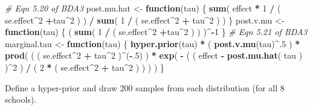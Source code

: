 \documentclass[]{article}
\newenvironment{Shaded}{\begin{snugshade}}{\end{snugshade}}
\newcommand{\KeywordTok}[1]{\textcolor[rgb]{0.13,0.29,0.53}{\textbf{#1}}}
\newcommand{\DecValTok}[1]{\textcolor[rgb]{0.00,0.00,0.81}{#1}}
\newcommand{\StringTok}[1]{\textcolor[rgb]{0.31,0.60,0.02}{#1}}
\newcommand{\CommentTok}[1]{\textcolor[rgb]{0.56,0.35,0.01}{\textit{#1}}}
\newcommand{\ControlFlowTok}[1]{\textcolor[rgb]{0.13,0.29,0.53}{\textbf{#1}}}
\newcommand{\OperatorTok}[1]{\textcolor[rgb]{0.81,0.36,0.00}{\textbf{#1}}}
\newcommand{\NormalTok}[1]{#1}
\begin{document}
\begin{Shaded}
\begin{Highlighting}[]
\CommentTok{# Eqn 5.20 of BDA3}
\NormalTok{post.mu.hat     <-}\StringTok{ }\ControlFlowTok{function}\NormalTok{(tau) \{}
  \KeywordTok{sum}\NormalTok{( effect }\OperatorTok{*}\StringTok{ }\DecValTok{1} \OperatorTok{/}\StringTok{ }\NormalTok{( se.effect}\OperatorTok{^}\DecValTok{2} \OperatorTok{+}\NormalTok{tau}\OperatorTok{^}\DecValTok{2}\NormalTok{ ) ) }\OperatorTok{/}\StringTok{ }
\StringTok{  }\KeywordTok{sum}\NormalTok{( }\DecValTok{1} \OperatorTok{/}\StringTok{ }\NormalTok{( se.effect}\OperatorTok{^}\DecValTok{2} \OperatorTok{+}\StringTok{ }\NormalTok{tau}\OperatorTok{^}\DecValTok{2}\NormalTok{ ) )}
\NormalTok{\}}
\NormalTok{post.v.mu       <-}\StringTok{ }\ControlFlowTok{function}\NormalTok{(tau) \{}
\NormalTok{  ( }\KeywordTok{sum}\NormalTok{( }\DecValTok{1} \OperatorTok{/}\StringTok{ }\NormalTok{( se.effect}\OperatorTok{^}\DecValTok{2} \OperatorTok{+}\NormalTok{tau}\OperatorTok{^}\DecValTok{2}\NormalTok{ ) ) )}\OperatorTok{^-}\DecValTok{1}
\NormalTok{\}}
\CommentTok{# Eqn 5.21 of BDA3}
\NormalTok{marginal.tau     <-}\StringTok{ }\ControlFlowTok{function}\NormalTok{(tau) \{}
  \KeywordTok{hyper.prior}\NormalTok{(tau) }\OperatorTok{*}\StringTok{ }
\StringTok{    }\NormalTok{( }\KeywordTok{post.v.mu}\NormalTok{(tau)}\OperatorTok{^}\NormalTok{.}\DecValTok{5}\NormalTok{ ) }\OperatorTok{*}\StringTok{ }
\StringTok{      }\KeywordTok{prod}\NormalTok{( ( ( se.effect}\OperatorTok{^}\DecValTok{2} \OperatorTok{+}\StringTok{ }\NormalTok{tau}\OperatorTok{^}\DecValTok{2}\NormalTok{ )}\OperatorTok{^}\NormalTok{(}\OperatorTok{-}\NormalTok{.}\DecValTok{5}\NormalTok{) ) }\OperatorTok{*}\StringTok{ }
\StringTok{              }\KeywordTok{exp}\NormalTok{( }\OperatorTok{-}\StringTok{ }\NormalTok{( ( effect }\OperatorTok{-}\StringTok{ }\KeywordTok{post.mu.hat}\NormalTok{( tau ) )}\OperatorTok{^}\DecValTok{2}\NormalTok{ ) }
                   \OperatorTok{/}\StringTok{ }\NormalTok{( }\DecValTok{2} \OperatorTok{*}\StringTok{ }\NormalTok{( se.effect}\OperatorTok{^}\DecValTok{2} \OperatorTok{+}\StringTok{ }\NormalTok{tau}\OperatorTok{^}\DecValTok{2}\NormalTok{ ) ) ) )}
\NormalTok{\}}
\end{Highlighting}
\end{Shaded}

Define a hyper-prior and draw 200 samples from each distribution (for
all 8 schools).
\end{document}
